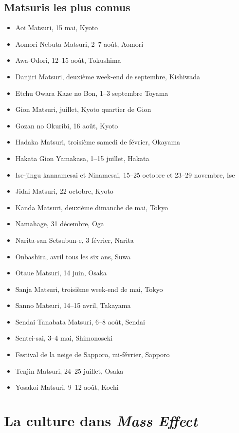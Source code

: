 \section{Matsuris les plus connus}

\begin{itemize}
	\item Aoi Matsuri, 15 mai, Kyoto
	\item Aomori Nebuta Matsuri, 2--7 août, Aomori
	\item Awa-Odori, 12--15 août, Tokushima
	\item Danjiri Matsuri, deuxième week-end de septembre, Kishiwada
	\item Etchu Owara Kaze no Bon, 1--3 septembre Toyama
	\item Gion Matsuri, juillet, Kyoto quartier de Gion
	\item Gozan no Okuribi, 16 août, Kyoto
	\item Hadaka Matsuri, troisième samedi de février, Okayama
	\item Hakata Gion Yamakasa, 1--15 juillet, Hakata
	\item Ise-jingu kannamesai et Ninamesai, 15--25 octobre et 23--29 novembre, Ise
	\item Jidai Matsuri, 22 octobre, Kyoto
	\item Kanda Matsuri, deuxième dimanche de mai, Tokyo
	\item Namahage, 31 décembre, Oga
	\item Narita-san Setsubun-e, 3 février, Narita
	\item Onbashira, avril tous les six ans, Suwa
	\item Otaue Matsuri, 14 juin, Osaka
	\item Sanja Matsuri, troisième week-end de mai, Tokyo
	\item Sanno Matsuri, 14--15 avril, Takayama
	\item Sendai Tanabata Matsuri, 6--8 août, Sendai
	\item Sentei-sai, 3--4 mai, Shimonoseki
	\item Festival de la neige de Sapporo, mi-février, Sapporo
	\item Tenjin Matsuri, 24--25 juillet, Osaka
	\item Yosakoi Matsuri, 9--12 août, Kochi
\end{itemize}

\chapter{La culture dans \textit{Mass Effect}}
